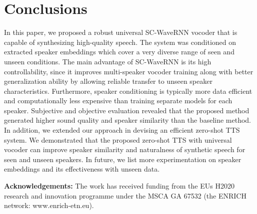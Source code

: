 \documentclass[a4paper]{article}
\begin{document}
\section{Conclusions}
\vspace{-1mm}
In this paper, we proposed a robust universal SC-WaveRNN vocoder that is capable of synthesizing high-quality speech. The system was conditioned on extracted speaker embeddings which cover a very diverse range of seen and unseen conditions. The main advantage of SC-WaveRNN is its high controllability, since it improves multi-speaker vocoder training along with better generalization ability by allowing reliable transfer to unseen speaker characteristics. Furthermore, speaker conditioning is typically more data efficient and computationally less expensive than training separate models for each speaker. Subjective and objective evaluation revealed that the proposed method generated higher sound quality and speaker similarity than the baseline method. In addition, we extended our approach in devising an efficient zero-shot TTS system. We demonstrated that the proposed zero-shot TTS with universal vocoder can improve speaker similarity and naturalness of synthetic speech for seen and unseen speakers. In future, we list more experimentation on speaker embeddings and its effectiveness with unseen data.

\footnotesize{\bf Acknowledgements:} The work has received funding from the EUs H2020 research and innovation programme under the MSCA GA 67532 (the ENRICH network: www.enrich-etn.eu).

\clearpage


\end{document}
